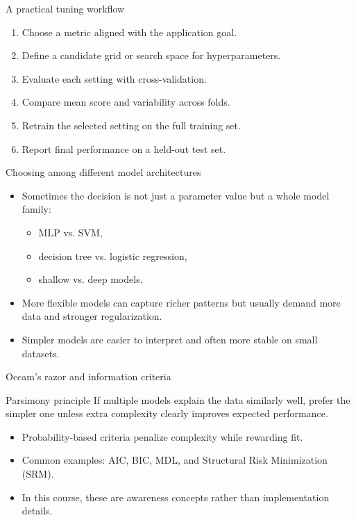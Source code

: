 \documentclass[12pt]{beamer}
\begin{document}
\begin{frame}{A practical tuning workflow}
  \begin{enumerate}
    \item Choose a metric aligned with the application goal.
    \item Define a candidate grid or search space for hyperparameters.
    \item Evaluate each setting with cross-validation.
    \item Compare mean score and variability across folds.
    \item Retrain the selected setting on the full training set.
    \item Report final performance on a held-out test set.
  \end{enumerate}
\end{frame}

\begin{frame}{Choosing among different model architectures}
  \begin{itemize}
    \item Sometimes the decision is not just a parameter value but a whole model family:
      \begin{itemize}
        \item MLP vs. SVM,
        \item decision tree vs. logistic regression,
        \item shallow vs. deep models.
      \end{itemize}
    \item More flexible models can capture richer patterns but usually demand more data and stronger regularization.
    \item Simpler models are easier to interpret and often more stable on small datasets.
  \end{itemize}
\end{frame}

\begin{frame}{Occam's razor and information criteria}
  \begin{conceptbox}{Parsimony principle}
    If multiple models explain the data similarly well, prefer the simpler one unless extra complexity
    clearly improves expected performance.
  \end{conceptbox}
  \begin{itemize}
    \item Probability-based criteria penalize complexity while rewarding fit.
    \item Common examples: AIC, BIC, MDL, and Structural Risk Minimization (SRM).
    \item In this course, these are awareness concepts rather than implementation details.
  \end{itemize}
\end{frame}
\end{document}
